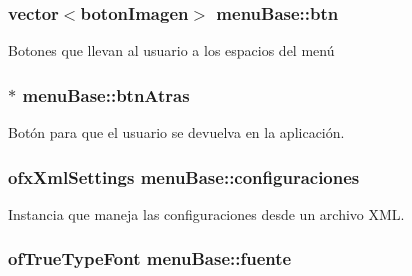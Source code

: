 \subsubsection[{btn}]{\setlength{\rightskip}{0pt plus 5cm}vector$<${\bf boton\+Imagen}$>$ menu\+Base\+::btn\hspace{0.3cm}{\ttfamily [protected]}}\label{classmenu_base_a6de979e3389d5918db62c75d886161d9}


Botones que llevan al usuario a los espacios del menú 

\hypertarget{classmenu_base_a28cf020839a96b7793388baf8a9e054d}{}
\subsubsection[{btn\+Atras}]{$\ast$ menu\+Base\+::btn\+Atras\hspace{0.3cm}{\ttfamily [protected]}}\label{classmenu_base_a28cf020839a96b7793388baf8a9e054d}


Botón para que el usuario se devuelva en la aplicación. 

\hypertarget{classmenu_base_a07ca6fd4669759542b11d31eada55403}{}
\subsubsection[{configuraciones}]{\setlength{\rightskip}{0pt plus 5cm}ofx\+Xml\+Settings menu\+Base\+::configuraciones\hspace{0.3cm}{\ttfamily [protected]}}\label{classmenu_base_a07ca6fd4669759542b11d31eada55403}


Instancia que maneja las configuraciones desde un archivo X\+M\+L. 

\hypertarget{classmenu_base_a8c48cc67dd9d789cf5a06c61333c8db9}{}
\subsubsection[{fuente}]{\setlength{\rightskip}{0pt plus 5cm}of\+True\+Type\+Font menu\+Base\+::fuente\hspace{0.3cm}{\ttfamily [protected]}}\label{classmenu_base_a8c48cc67dd9d789cf5a06c61333c8db9}


